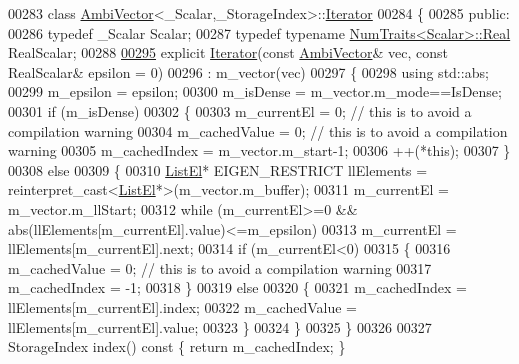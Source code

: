 \begin{DoxyCode}
00283 \textcolor{keyword}{class }\hyperlink{class_eigen_1_1internal_1_1_ambi_vector}{AmbiVector}<\_Scalar,\_StorageIndex>::\hyperlink{class_eigen_1_1internal_1_1_ambi_vector_1_1_iterator}{Iterator}
00284 \{
00285   \textcolor{keyword}{public}:
00286     \textcolor{keyword}{typedef} \_Scalar Scalar;
00287     \textcolor{keyword}{typedef} \textcolor{keyword}{typename} \hyperlink{group___core___module_struct_eigen_1_1_num_traits}{NumTraits<Scalar>::Real} RealScalar;
00288 
\hyperlink{class_eigen_1_1internal_1_1_ambi_vector_1_1_iterator_a2201eecfa8e104d9f2017e47c5f24583}{00295}     \textcolor{keyword}{explicit} \hyperlink{class_eigen_1_1internal_1_1_ambi_vector_1_1_iterator_a2201eecfa8e104d9f2017e47c5f24583}{Iterator}(\textcolor{keyword}{const} \hyperlink{class_eigen_1_1internal_1_1_ambi_vector}{AmbiVector}& vec, \textcolor{keyword}{const} RealScalar& epsilon = 0)
00296       : m\_vector(vec)
00297     \{
00298       \textcolor{keyword}{using} std::abs;
00299       m\_epsilon = epsilon;
00300       m\_isDense = m\_vector.m\_mode==IsDense;
00301       \textcolor{keywordflow}{if} (m\_isDense)
00302       \{
00303         m\_currentEl = 0;   \textcolor{comment}{// this is to avoid a compilation warning}
00304         m\_cachedValue = 0; \textcolor{comment}{// this is to avoid a compilation warning}
00305         m\_cachedIndex = m\_vector.m\_start-1;
00306         ++(*this);
00307       \}
00308       \textcolor{keywordflow}{else}
00309       \{
00310         \hyperlink{struct_eigen_1_1internal_1_1_ambi_vector_1_1_list_el}{ListEl}* EIGEN\_RESTRICT llElements = \textcolor{keyword}{reinterpret\_cast<}\hyperlink{struct_eigen_1_1internal_1_1_ambi_vector_1_1_list_el}{ListEl}*\textcolor{keyword}{>}(m\_vector.m\_buffer);
00311         m\_currentEl = m\_vector.m\_llStart;
00312         \textcolor{keywordflow}{while} (m\_currentEl>=0 && abs(llElements[m\_currentEl].value)<=m\_epsilon)
00313           m\_currentEl = llElements[m\_currentEl].next;
00314         \textcolor{keywordflow}{if} (m\_currentEl<0)
00315         \{
00316           m\_cachedValue = 0; \textcolor{comment}{// this is to avoid a compilation warning}
00317           m\_cachedIndex = -1;
00318         \}
00319         \textcolor{keywordflow}{else}
00320         \{
00321           m\_cachedIndex = llElements[m\_currentEl].index;
00322           m\_cachedValue = llElements[m\_currentEl].value;
00323         \}
00324       \}
00325     \}
00326 
00327     StorageIndex index()\textcolor{keyword}{ const }\{ \textcolor{keywordflow}{return} m\_cachedIndex; \}

\end{DoxyCode}
